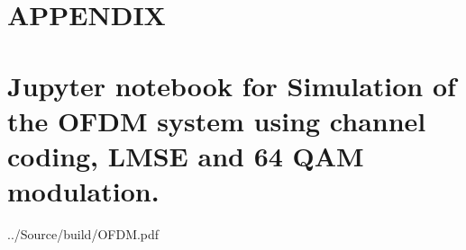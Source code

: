 \section*{APPENDIX}
\setcounter{section}{1}
\setcounter{subsection}{0}
\section*{Jupyter notebook for Simulation of the OFDM system using channel
coding, LMSE and 64 QAM modulation.}\label{pl:dac}


{../Source/build/OFDM.pdf}